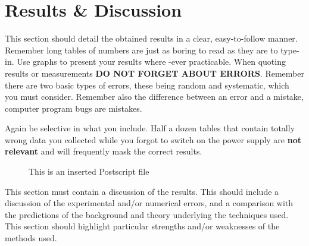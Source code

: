 


\section{Results \& Discussion}

This section should detail the obtained results in a clear,
easy-to-follow manner. Remember long tables of numbers are just as boring to
read as they are to type-in. Use graphs to present your results where
-ever practicable. When quoting results or measurements
{\bf DO NOT FORGET ABOUT ERRORS}. Remember there are two basic types
of errors, these being random and systematic, which you must consider.
Remember also the difference between an error and a mistake, computer
program bugs are mistakes.

 
Again be selective in what you include. Half a dozen
tables that contain totally wrong data you collected while you forgot
to switch on the power supply are {\bf not relevant} and will frequently
mask the correct results. 
%
%
\begin{figure}[htb]     %
        \begin{center}
                \leavevmode             %
                \epsfxsize=90mm         %
\end{center}
\caption{This is an inserted Postscript file}
\end{figure}

This section must contain a discussion of the results. This should
include a discussion of the experimental and/or numerical errors, and a
comparison with the predictions of the background and theory underlying
the techniques used. This section should highlight particular strengths
and/or weaknesses of the methods used.